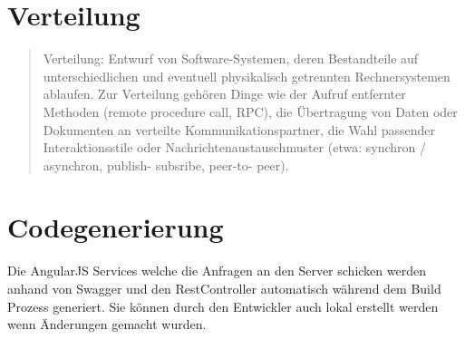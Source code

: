 \section{Verteilung}

\begin{quote}
	Verteilung: Entwurf von Software-Systemen, deren Bestandteile auf unterschiedlichen und eventuell physikalisch getrennten Rechnersystemen ablaufen.
	Zur Verteilung gehören Dinge wie der Aufruf entfernter Methoden (remote procedure call, RPC), die Übertragung von Daten oder Dokumenten an verteilte Kommunikationspartner, die Wahl passender Interaktionsstile oder Nachrichtenaustauschmuster (etwa: synchron / asynchron, publish- subsribe, peer-to- peer).
\end{quote}

\section{Codegenerierung}

Die AngularJS Services welche die Anfragen an den Server schicken werden anhand von Swagger und den RestController automatisch während dem Build Prozess generiert. Sie können durch den Entwickler auch lokal erstellt werden wenn Änderungen gemacht wurden.